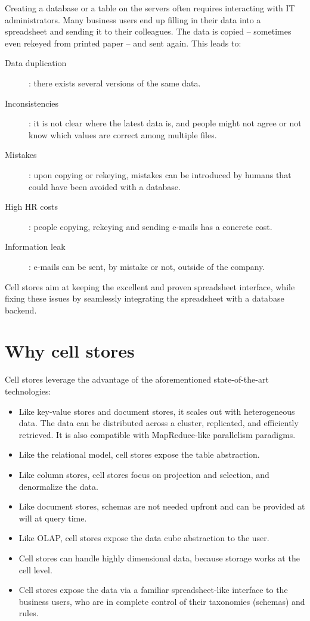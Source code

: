 \documentclass{vldb}
\begin{document}
Creating a database or a table on the servers often requires interacting with IT administrators. Many business users end up filling in their data into a spreadsheet and sending it to their colleagues. The data is copied -- sometimes even rekeyed from printed paper -- and sent again. This leads to:

\begin{description}
\item[Data duplication]: there exists several versions of the same data.
\item [Inconsistencies]: it is not clear where the latest data is, and people might not agree or not know which values are correct among multiple files.
\item[Mistakes]: upon copying or rekeying, mistakes can be introduced by humans that could have been avoided with a database.
\item[High HR costs]: people copying, rekeying and sending e-mails has a concrete cost.
\item[Information leak]: e-mails can be sent, by mistake or not, outside of the company.
\end{description}

Cell stores aim at keeping the excellent and proven spreadsheet interface, while fixing these issues by seamlessly integrating the spreadsheet with a database backend.

\section{Why cell stores}
\label{section-why}

Cell stores leverage the advantage of the aforementioned state-of-the-art technologies:

\begin{itemize}
\item Like key-value stores and document stores, it scales out with heterogeneous data. The data can be distributed across a cluster, replicated, and efficiently retrieved. It is also compatible with MapReduce-like parallelism paradigms.
\item Like the relational model, cell stores expose the table abstraction.
\item Like column stores, cell stores focus on projection and selection, and denormalize the data. 
\item Like document stores, schemas are not needed upfront and can be provided at will at query time.
\item Like OLAP, cell stores expose the data cube abstraction to the user.
\item Cell stores can handle highly dimensional data, because storage works at the cell level.
\item Cell stores expose the data via a familiar spreadsheet-like interface to the business users, who are in complete control of their taxonomies (schemas) and rules.
\end{itemize}
\end{document}
